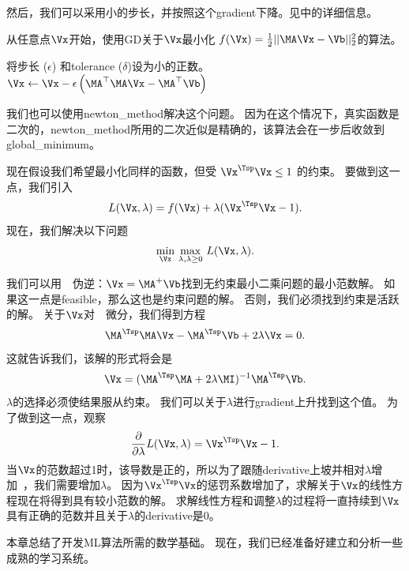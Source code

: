 然后，我们可以采用小的步长，并按照这个\gls{gradient}下降。见中的详细信息。

\begin{algorithm}[ht]
\caption{从任意点$\Vx$开始，使用\gls{GD}关于$\Vx$最小化
$ f(\Vx) = \frac{1}{2} || \MA \Vx - \Vb ||_2^2$的算法。
}
\label{alg:gdlsq}
\begin{algorithmic}
\STATE 将步长 ($\epsilon$) 和\gls{tolerance} ($\delta$)设为小的正数。
\STATE $\Vx \leftarrow \Vx - \epsilon \left( \MA^\top \MA \Vx - \MA^\top \Vb \right)$
\ENDWHILE
\end{algorithmic}
\end{algorithm}


我们也可以使用\gls{newton_method}解决这个问题。
因为在这个情况下，真实函数是二次的，\gls{newton_method}所用的二次近似是精确的，该算法会在一步后收敛到\gls{global_minimum}。

现在假设我们希望最小化同样的函数，但受 $\Vx^\Tsp \Vx \leq 1$ 的约束。 
要做到这一点，我们引入~
\begin{align}
 L(\Vx, \lambda) = f(\Vx) + \lambda (\Vx^\Tsp \Vx - 1).
\end{align}
现在，我们解决以下问题
\begin{align}
  \underset{\Vx}{\min}~
 \underset{\lambda, \lambda \geq 0}{\max}~ L(\Vx, \lambda) .
\end{align}


我们可以用~~伪逆：$\Vx = \MA^+ \Vb$找到无约束最小二乘问题的最小范数解。
如果这一点是\gls{feasible}，那么这也是约束问题的解。
否则，我们必须找到约束是活跃的解。
关于$\Vx$对~~微分，我们得到方程
\begin{align}
 \MA^\Tsp \MA \Vx - \MA^\Tsp \Vb + 2 \lambda \Vx = 0.
\end{align}
这就告诉我们，该解的形式将会是
\begin{align}
\Vx =  (\MA^\Tsp \MA + 2 \lambda \MI )^{-1} \MA^\Tsp \Vb.
\end{align}
$\lambda$的选择必须使结果服从约束。
我们可以关于$\lambda$进行\gls{gradient}上升找到这个值。
为了做到这一点，观察
\begin{align}
 \frac{\partial}{\partial \lambda} L(\Vx, \lambda)  = \Vx^\Tsp \Vx - 1.
\end{align}
当$\Vx$的范数超过1时，该导数是正的，所以为了跟随\gls{derivative}上坡并相对$\lambda$增加~，我们需要增加$\lambda$。
因为$\Vx^\Tsp \Vx$的惩罚系数增加了，求解关于$\Vx$的线性方程现在将得到具有较小范数的解。
求解线性方程和调整$\lambda$的过程将一直持续到$\Vx$具有正确的范数并且关于$\lambda$的\gls{derivative}是$0$。

本章总结了开发\gls{ML}算法所需的数学基础。
现在，我们已经准备好建立和分析一些成熟的学习系统。


